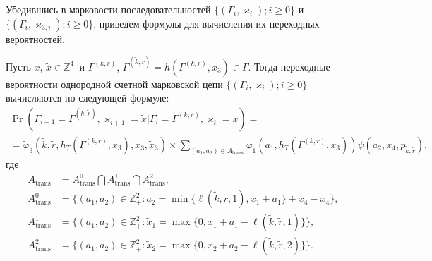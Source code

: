 \documentclass[a4paper,12pt,russian]{extarticle}
\newcommand{\Mark}{\{(\Gamma_i, \varkappa_i); i \geqslant 0\}}
\newcommand{\MarkThree}{\{(\Gamma_i, \varkappa_{3,i}); i \geqslant 0\}}
\begin{document}
Убедившись в марковости последовательностей $\Mark$ и $\MarkThree$, приведем формулы для вычисления их переходных вероятностей. 
\begin{theorem}
Пусть $x$, $\tilde{x}\in \mathbb{Z}_+^4$ и $\Gamma^{(k,r)}$, $\Gamma^{(\tilde{k},\tilde{r})}=h(\Gamma^{(k,r)},x_3) \in \Gamma$. Тогда переходные вероятности однородной счетной марковской цепи $\Mark$ вычисляются по следующей формуле:
\begin{multline}
\Pr (\Gamma_{i+1}=\Gamma^{(\tilde{k},\tilde{r})},\varkappa_{i+1}=\tilde{x} | \Gamma_{i}=\Gamma^{(k,r)},\varkappa_i=x)=\\ 
=\widetilde{\varphi}_3(\tilde{k},\tilde{r},h_T(\Gamma^{(k,r)},x_3),x_3,\tilde{x}_3)\times
\sum_{(a_1,a_2)\in A_{\mathrm{trans}}}\varphi_1(a_1,h_T(\Gamma^{(k,r)},x_3))  \psi(a_2,x_4, p_{\tilde{k},\tilde{r}}),
\label{transitionToProve}
\end{multline}
где 
\begin{align*}
A_{\mathrm{trans}} &= A_{\mathrm{trans}}^0 \bigcap A_{\mathrm{trans}}^1\bigcap A_{\mathrm{trans}}^2,\\
A_{\mathrm{trans}}^0 &= \{(a_1,a_2) \in \mathbb{Z}_+^2 \colon a_2 = \min{\{\ell(\tilde{k},\tilde{r},1), x_1+a_1}\} +x_4-\tilde{x}_4\},\\
A_{\mathrm{trans}}^1 &= \{(a_1,a_2) \in \mathbb{Z}_+^2 \colon \tilde{x}_1=\max{\{0,x_1+a_1-\ell(\tilde{k},\tilde{r},1)\}}\},\\
A_{\mathrm{trans}}^2 &= \{(a_1,a_2) \in \mathbb{Z}_+^2 \colon  \tilde{x}_2=\max{\{0,x_2+a_2-\ell(\tilde{k},\tilde{r},2)\}}\}.
\end{align*}
\end{theorem}
\end{document}

